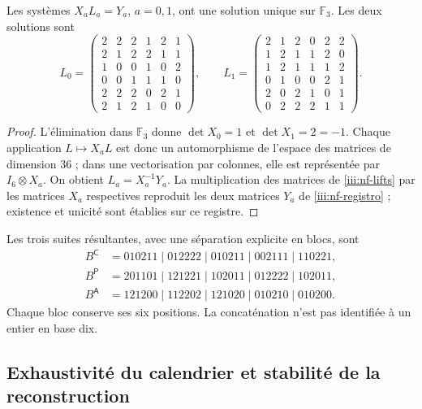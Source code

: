 \begin{proposition}
\label{iii:nf-unicidad}
Les systèmes $X_aL_a=Y_a$, $a=0,1$, ont une solution unique sur
$\mathbb F_3$. Les deux solutions sont
\begingroup\small
\begin{equation}
L_0=\begin{pmatrix}
2&2&2&1&2&1\\2&1&2&2&1&1\\1&0&0&1&0&2\\
0&0&1&1&1&0\\2&2&2&0&2&1\\2&1&2&1&0&0
\end{pmatrix},\qquad
L_1=\begin{pmatrix}
2&1&2&0&2&2\\1&2&1&1&2&0\\1&2&1&1&1&2\\
0&1&0&0&2&1\\2&0&2&1&0&1\\0&2&2&2&1&1
\end{pmatrix}.
\label{iii:nf-lifts}
\end{equation}
\endgroup
\end{proposition}

\begin{proof}
L’élimination dans $\mathbb F_3$ donne $\det X_0=1$ et
$\det X_1=2=-1$. Chaque application $L\mapsto X_aL$ est donc
un automorphisme de l’espace des matrices de dimension $36$ ; dans une
vectorisation par colonnes, elle est représentée par $I_6\otimes X_a$.
On obtient $L_a=X_a^{-1}Y_a$. La multiplication des matrices de
\eqref{iii:nf-lifts} par les matrices $X_a$ respectives reproduit les
deux matrices $Y_a$ de \eqref{iii:nf-registro} ; existence et unicité
sont établies sur ce registre.
\end{proof}

Les trois suites résultantes, avec une séparation explicite en blocs,
sont
\begin{align*}
 B^{\mathsf C}&=010211\mid012222\mid010211\mid002111\mid110221,\\
 B^{\mathsf P}&=201101\mid121221\mid102011\mid012222\mid102011,\\
 B^{\mathsf A}&=121200\mid112202\mid121020\mid010210\mid010200.
\end{align*}
Chaque bloc conserve ses six positions. La concaténation n’est pas
identifiée à un entier en base dix.

\subsection{Exhaustivité du calendrier et stabilité de la reconstruction}

